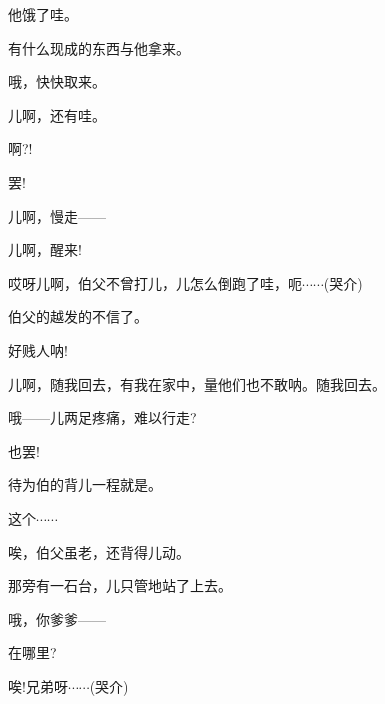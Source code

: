 {{他饿了哇。}

{有什么现成的东西与他拿来。}

{哦，快快取来。}

{儿啊，还有哇。}

{啊?!}


{罢!}



{\vspace{5pt}}

{儿啊，慢走------}



{\vspace{5pt}}

{儿啊，醒来!}

{哎呀儿啊，伯父不曾打儿，儿怎么倒跑了哇，呃$\cdots{}\cdots{}$({\hwfs 哭介})}

{伯父的越发的不信了。}

{好贱人呐!}


{儿啊，随我回去，有我在家中，量他们也不敢呐。随我回去。}

{哦------儿两足疼痛，难以行走?}

{也罢!}

{待为伯的背儿一程就是。}

{这个$\cdots{}\cdots{}$}

{唉，伯父虽老，还背得儿动。}

{那旁有一石台，儿只管地站了上去。}


{哦，你爹爹------}

{在哪里?}

{唉!兄弟呀$\cdots{}\cdots{}$({\hwfs 哭介})}

}
